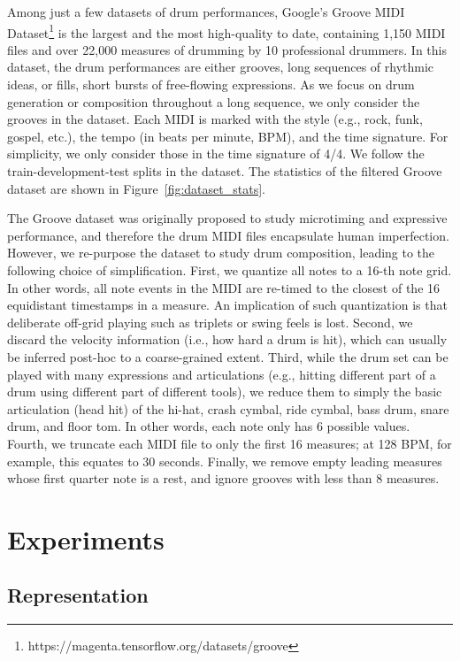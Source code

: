 \documentclass[letterpaper]{article} %
\begin{document}
Among just a few datasets of drum performances, Google's Groove MIDI Dataset\footnote{https://magenta.tensorflow.org/datasets/groove} is the largest and the most high-quality to date, containing 1,150 MIDI files and over 22,000 measures of drumming by 10 professional drummers. In this dataset, the drum performances are either grooves, long sequences of rhythmic ideas, or fills, short bursts of free-flowing expressions. As we focus on drum generation or composition throughout a long sequence, we only consider the grooves in the dataset. Each MIDI is marked with the style (e.g., rock, funk, gospel, etc.), the tempo (in beats per minute, BPM), and the time signature. For simplicity, we only consider those in the time signature of 4/4. We follow the train-development-test splits in the dataset. The statistics of the filtered Groove dataset are shown in Figure~\ref{fig:dataset_stats}.

The Groove dataset was originally proposed to study microtiming and expressive performance, and therefore the drum MIDI files encapsulate human imperfection. However, we re-purpose the dataset to study drum composition, leading to the following choice of simplification. First, we quantize all notes to a 16-th note grid. In other words, all note events in the MIDI are re-timed to the closest of the 16 equidistant timestamps in a measure. An implication of such quantization is that deliberate off-grid playing such as triplets or swing feels is lost. Second, we discard the velocity information (i.e., how hard a drum is hit), which can usually be inferred post-hoc to a coarse-grained extent. Third, while the drum set can be played with many expressions and articulations (e.g., hitting different part of a drum using different part of different tools), we reduce them to simply the basic articulation (head hit) of the hi-hat, crash cymbal, ride cymbal, bass drum, snare drum, and floor tom. In other words, each note only has 6 possible values. Fourth, we truncate each MIDI file to only the first 16 measures; at 128 BPM, for example, this equates to 30 seconds. Finally, we remove empty leading measures whose first quarter note is a rest, and ignore grooves with less than 8 measures.

\section{Experiments}

\subsection{Representation}
\end{document}
